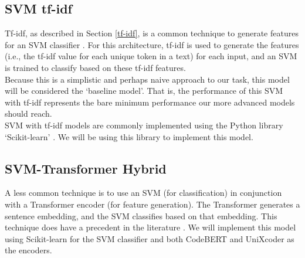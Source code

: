\subsection{SVM tf-idf}

\noindent
Tf-idf, as described in Section \ref{tf-idf}, is a common technique to generate features for an SVM classifier \cite{sentiment-analysis-cb} \cite{sentiment-analysis-fin}. For this architecture, tf-idf is used to generate the features (i.e., the tf-idf value for each unique token in a text) for each input, and an SVM is trained to classify based on these tf-idf features.\\

\noindent
Because this is a simplistic and perhaps naive approach to our task, this model will be considered the `baseline model'. That is, the performance of this SVM with tf-idf represents the bare minimum performance our more advanced models should reach. \\

\noindent
SVM with tf-idf models are commonly implemented using the Python library `Scikit-learn' \cite{scikit-learn}. We will be using this library to implement this model. 



\subsection{SVM-Transformer Hybrid}

\noindent
A less common technique is to use an SVM (for classification) in conjunction with a Transformer encoder (for feature generation). The Transformer generates a sentence embedding, and the SVM classifies based on that embedding. This technique does have a precedent in the literature \cite{svm-with-transformer} \cite{svm-with-embeddings}. We will implement this model using Scikit-learn for the SVM classifier and both CodeBERT and UniXcoder as the encoders. \\

